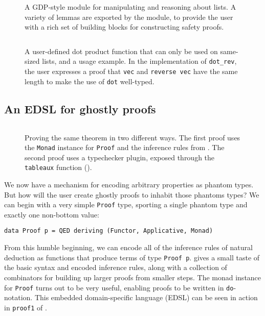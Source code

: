 \documentclass[format=sigplan, review=false, screen=true]{acmart}
\begin{document}
\begin{figure}
    \inputminted{haskell}{ex1.hs}
    \caption{A GDP-style module for manipulating and reasoning about lists.
      A variety of lemmas are exported by the module, to provide the
      user with a rich set of building blocks for constructing safety proofs.
       \label{lemma-demo}}
\end{figure}
\begin{figure}
    \inputminted{haskell}{ex2.hs}
    \caption{A user-defined dot product function that can only be used on same-sized lists,
      and a usage example. In the implementation of \texttt{dot\_rev}, the user expresses a proof that
      \texttt{vec} and \texttt{reverse vec} have the same length to make the use of \texttt{dot}
       well-typed.\label{dot-product}}
\end{figure}

\subsection{An EDSL for ghostly proofs}


\begin{figure}
  \inputminted{haskell}{tableaux.hs}
  \caption{Proving the same theorem in two different ways. The first proof
    uses the \texttt{Monad} instance for
    \texttt{Proof} and the inference rules from . The second
    proof uses a typechecker plugin, exposed through the \texttt{tableaux}
    function ().
    \label{tableaux-example}}
\end{figure}
We now have a mechanism for encoding arbitrary properties as phantom types. But how will the user
create ghostly proofs to inhabit those phantoms types?
We can begin with a very simple \texttt{Proof} type,
sporting a single phantom type and exactly one non-bottom value:
\begin{verbatim}
data Proof p = QED deriving (Functor, Applicative, Monad)
\end{verbatim} 
From this humble beginning, we can encode all of the inference rules of natural deduction as functions that
produce terms of type \texttt{Proof p}.
 gives a small taste of the basic syntax and encoded inference rules, along with
a collection of combinators for building up larger proofs from smaller steps.
The monad instance for \texttt{Proof} turns out to be very useful, enabling proofs to be written in
\texttt{do}-notation. This embedded domain-specific language (EDSL) can be seen in action
in \texttt{proof1} of .
\end{document}

